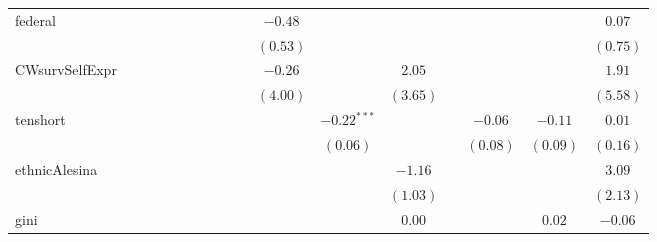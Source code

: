 \documentclass[a4paper]{article}\usepackage{graphicx, color}
\begin{document}
\begin{landscape}
\begin{table}
{{\begin{tabular}{l c c c c c c c c c c c c c c c c }
federal             &               &               &               &               &               &               &               &               &               & $-0.48$  &               &          &          &              &             & $0.07$              \\
                    &               &               &               &               &               &               &               &               &               & $(0.53)$ &               &          &          &              &             & $(0.75)$            \\
CWsurvSelfExpr      &               &               &               &               &               &               &               &               &               & $-0.26$  &               & $2.05$   &          &              &             & $1.91$              \\
                    &               &               &               &               &               &               &               &               &               & $(4.00)$ &               & $(3.65)$ &          &              &             & $(5.58)$            \\
tenshort            &               &               &               &               &               &               &               &               &               &          & $-0.22^{***}$ &          &          & $-0.06$      & $-0.11$     & $0.01$              \\
                    &               &               &               &               &               &               &               &               &               &          & $(0.06)$      &          &          & $(0.08)$     & $(0.09)$    & $(0.16)$            \\
ethnicAlesina       &               &               &               &               &               &               &               &               &               &          &               & $-1.16$  &          &              &             & $3.09$              \\
                    &               &               &               &               &               &               &               &               &               &          &               & $(1.03)$ &          &              &             & $(2.13)$            \\
gini                &               &               &               &               &               &               &               &               &               &          &               & $0.00$   &          &              & $0.02$      & $-0.06$             \\

\end{tabular}}}
\end{table}
\end{landscape}
\end{document}
